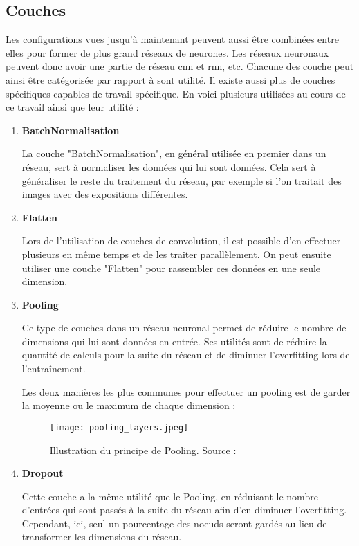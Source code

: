 \subsection{Couches}
Les configurations vues jusqu'à maintenant peuvent aussi être combinées entre elles pour former de plus grand réseaux de neurones.
Les réseaux neuronaux peuvent donc avoir une partie de réseau \gls{cnn} et \gls{rnn}, etc. Chacune des couche peut ainsi être catégorisée par
rapport à sont utilité.
Il existe aussi plus de couches spécifiques capables de travail spécifique. En voici plusieurs utilisées au cours de ce travail ainsi que leur utilité :

\begin{enumerate}
    \item \textbf{BatchNormalisation}

	La couche "BatchNormalisation", en général utilisée en premier dans un réseau, sert à normaliser les données qui lui sont données.
	Cela sert à généraliser le reste du traitement du réseau, par exemple si l'on traitait des images avec des expositions différentes.

    \item \textbf{Flatten}

	Lors de l'utilisation de couches de convolution, il est possible d'en effectuer plusieurs en même temps et de les traiter parallèlement.
	On peut ensuite utiliser une couche "Flatten" pour rassembler ces données en une seule dimension.

    \item \textbf{Pooling}

    Ce type de couches dans un réseau neuronal permet de réduire le nombre de dimensions qui lui sont données en entrée.
	Ses utilités sont de réduire la quantité de calculs pour la suite du réseau et de diminuer l'overfitting lors de l'entraînement.

	Les deux manières les plus communes pour effectuer un pooling est de garder la moyenne ou le maximum de chaque dimension :

	\begin{figure}[tbph!]
		\centering
		\texttt{[image: pooling\_layers.jpeg]}
		\caption[Illustration du principe de Pooling]{Illustration du principe de Pooling. Source : \cite{PoolingImage}}
	\end{figure}

    \item \textbf{Dropout}
    
	Cette couche a la même utilité que le Pooling, en réduisant le nombre d'entrées qui sont passés à la suite du réseau afin d'en diminuer l'overfitting.
	Cependant, ici, seul un pourcentage des noeuds seront gardés au lieu de transformer les dimensions du réseau.
\end{enumerate}

